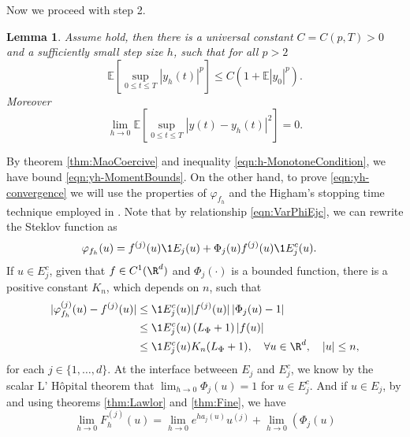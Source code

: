 \documentclass[sort&compress, preprint]{elsarticle}
\theoremstyle{definition}
\theoremstyle{plain}%
\newtheorem{lem}{Lemma}[section]
\theoremstyle{remark}
\newcommand{\m}[1]{\mathbb{E}#1}
\begin{document}
	Now we proceed with step 2. 
\begin{lem}\label{lem:BoundAndConvergenceOfyh}
	Assume  hold, then there is a universal 
	constant $C=C(p,T)>0$ and a sufficiently small
	step size $h$, such that for all $p>2$
	\begin{equation}\label{eqn:yh-MomentBounds}
		\m\left[
			\sup_{0\leq t \leq T}
				|y_h(t)|^p
		\right]
		\leq
			C
		\left( 
			1+\m |y_0|^p
		\right).
	\end{equation}
	Moreover
	\begin{equation}\label{eqn:yh-convergence}
	\lim_{h \to 0}
	\m\left[
	\sup_{0\leq t \leq T}
	|y(t)-y_h(t)|^2
	\right]=0.
	\end{equation}
\end{lem}
\begin{pf}
	By theorem \ref{thm:MaoCoercive} and inequality \eqref{eqn:h-MonotoneCondition}, 
	we have	 bound \eqref{eqn:yh-MomentBounds}.
	On the other hand, to prove \eqref{eqn:yh-convergence} we will use the properties of 
	$\varphi_{f_h}$ and the Higham's stopping time technique employed in \cite[Thm 2.2]{Higham2002b}. 
	Note that by relationship \eqref{eqn:VarPhiEjc}, we can rewrite the Steklov function  as
	\begin{align}\label{fo}
		\varphi_{f_h}(u) 
			&=  f^{(j)}(u) \1{E_j}(u) +\Phi_j(u) f^{(j)}(u) \1{E_j^c}(u) .
	\end{align}
	 If $u\in E_j^c$, given that  $f \in C^1(\R^d)$ and  
	$\Phi_j(\cdot)$ is a bounded function,
	there is a positive constant $K_n$, which depends on $n$, such that 
	\begin{align*}	
		|\varphi_{f_h}^{(j)}(u) - f^{(j)}(u)|
		&\leq
			\1{E_j^c}(u)
			|f^{(j)}(u)|
			\left|
				\Phi_j(u) - 1
			\right| \notag \\
		&\leq
			\1{E_j^c}(u)
			\left(
				L_{\Phi} + 1
			\right)
			|f(u)|	 \notag \\
		&\leq
		\1{E_j^c}(u) K_n(L_{\Phi}+1), \quad \forall u \in \R^d, \quad |u|\leq n,
	\end{align*}
	for each $j\in \{1,\dots, d\}$. At the interface betweeen $E_j$ and $E_j^c$, 
	we know by the scalar L' H\^{o}pital theorem that 
	$ \lim_{h\to 0} \Phi_j(u) = 1$ for $u\in E_j^c$.
	And if $u\in E_j$,  by  and using   
	theorems \ref{thm:Lawlor} and \ref{thm:Fine}, we have 
	\begin{equation*}
	\lim_{h \to 0} F_h^{(j)}(u)
		=
		\lim_{h \to 0}
			e^{ha_j(u)} u^{(j)} + 
		\lim_{h \to 0}
			\left( \Phi_j(u)

\end{equation*}
\end{pf}
\end{document}
